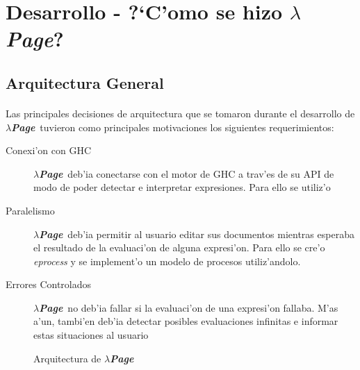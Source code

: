 \documentclass[a4paper]{article}
\newcommand{\hpage}{\textbf{\textsl{$\lambda$Page}}}
\begin{document}
\newpage
\section{Desarrollo - ?`C'omo se hizo \hpage?}
\subsection{Arquitectura General}
\begin{epigraphs}
\end{epigraphs}
\paragraph{}Las principales decisiones de arquitectura que se tomaron durante el desarrollo de \hpage\ tuvieron como principales motivaciones los siguientes requerimientos:
\begin{description}
\item[Conexi'on con GHC] \hpage\ deb'ia conectarse con el motor de GHC a trav'es de su API de modo de poder detectar e interpretar expresiones.  Para ello se utiliz'o ~\cite{hint}
\item[Paralelismo] \hpage\ deb'ia permitir al usuario editar sus documentos mientras esperaba el resultado de la evaluaci'on de alguna expresi'on.  Para ello se cre'o \textsl{eprocess} y se implement'o un modelo de procesos utiliz'andolo.
\item[Errores Controlados] \hpage\ no deb'ia fallar si la evaluaci'on de una expresi'on fallaba.  M'as a'un, tambi'en deb'ia detectar posibles evaluaciones infinitas e informar estas situaciones al usuario
\end{description}
\begin{figure}[hp]
	\begin{center}
		\caption{Arquitectura de \hpage}
		\label{arq1}
	\end{center}
\end{figure}
\end{document}
